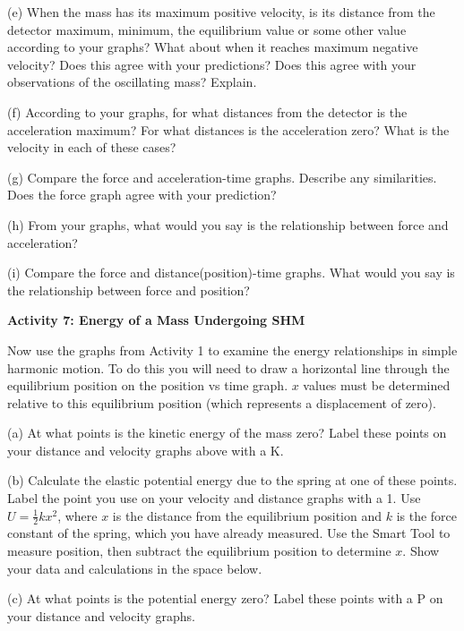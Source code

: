(e) When the mass has its maximum positive velocity, is its distance from the
detector maximum, minimum, the equilibrium value or some other value according
to your graphs? What about when it reaches maximum negative velocity? Does this
agree with your predictions? Does this agree with your observations of the 
oscillating mass? Explain. 
\answerspace{10mm}

\pagebreak[2]
(f) According to your graphs, for what distances from the detector is the 
acceleration maximum? For what distances is the acceleration zero? What is the 
velocity in each of these cases?
\vspace{20mm}

(g) Compare the force and acceleration-time graphs. Describe any similarities.
Does the force graph agree with your prediction?
\vspace{20mm}

(h) From your graphs, what would you say is the relationship between force and
acceleration? 
\vspace{20mm}

(i) Compare the force and distance(position)-time graphs. What would you say
is the relationship between force and position? 
\vspace{20mm}

\textbf{Activity 7: Energy of a Mass Undergoing SHM }

Now use the graphs from Activity 1 to examine the energy relationships
in simple harmonic motion. To do this you will need to draw a horizontal line through the equilibrium position on the position vs time graph.  $x$ values must be determined relative to this equilibrium position (which represents a displacement of zero).

(a) At what points is the kinetic energy of the mass zero? Label these points
on your distance and velocity graphs above with a K.

(b) Calculate the elastic potential energy due to the spring at one of these
points. Label the point you use on your velocity and distance graphs with a
1. Use $U = \frac{1}{2}kx^{2}$, where  $x$ is the distance from the equilibrium 
position and $k$ is the force constant of the spring, which you have already 
measured. Use the Smart Tool to measure position, then subtract the 
equilibrium position to determine $x$. Show your data and calculations 
in the space below. 
\vspace{25mm}

(c) At what points is the potential energy zero? Label these points with a P
on your distance and velocity graphs.

